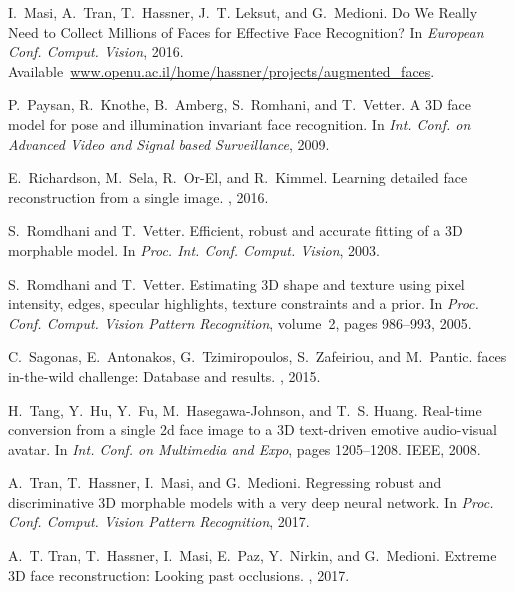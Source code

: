 \documentclass[a4paper, 10pt, conference]{ieeeconf}
\begin{document}
{\begin{thebibliography}{10}
I.~Masi, A.~Tran, T.~Hassner, J.~T. Leksut, and G.~Medioni.
\newblock Do {W}e {R}eally {N}eed to {C}ollect {M}illions of {F}aces for
  {E}ffective {F}ace {R}ecognition?
\newblock In {\em European Conf. Comput. Vision}, 2016.
\newblock
  Available~\url{www.openu.ac.il/home/hassner/projects/augmented_faces}.

P.~Paysan, R.~Knothe, B.~Amberg, S.~Romhani, and T.~Vetter.
\newblock A {3D} face model for pose and illumination invariant face
  recognition.
\newblock In {\em Int. Conf. on Advanced Video and Signal based Surveillance},
  2009.

E.~Richardson, M.~Sela, R.~Or-El, and R.~Kimmel.
\newblock Learning detailed face reconstruction from a single image.
, 2016.

S.~Romdhani and T.~Vetter.
\newblock Efficient, robust and accurate fitting of a {3D} morphable model.
\newblock In {\em Proc. Int. Conf. Comput. Vision}, 2003.

S.~Romdhani and T.~Vetter.
\newblock Estimating {3D} shape and texture using pixel intensity, edges,
  specular highlights, texture constraints and a prior.
\newblock In {\em Proc. Conf. Comput. Vision Pattern Recognition}, volume~2,
  pages 986--993, 2005.

C.~Sagonas, E.~Antonakos, G.~Tzimiropoulos, S.~Zafeiriou, and M.~Pantic.
 faces in-the-wild challenge: Database and results.
, 2015.

H.~Tang, Y.~Hu, Y.~Fu, M.~Hasegawa-Johnson, and T.~S. Huang.
\newblock Real-time conversion from a single 2d face image to a {3D}
  text-driven emotive audio-visual avatar.
\newblock In {\em Int. Conf. on Multimedia and Expo}, pages 1205--1208. IEEE,
  2008.

A.~Tran, T.~Hassner, I.~Masi, and G.~Medioni.
\newblock Regressing robust and discriminative {3D} morphable models with a
  very deep neural network.
\newblock In {\em Proc. Conf. Comput. Vision Pattern Recognition}, 2017.

A.~T. Tran, T.~Hassner, I.~Masi, E.~Paz, Y.~Nirkin, and G.~Medioni.
\newblock Extreme {3D} face reconstruction: Looking past occlusions.
, 2017.


\end{thebibliography}}
\end{document}
